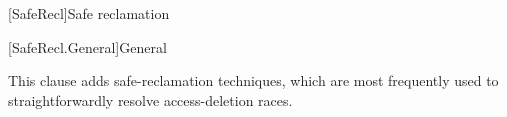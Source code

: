 
[SafeRecl]{Safe reclamation}

[SafeRecl.General]{General}

This clause adds safe-reclamation techniques, which are most frequently
used to straightforwardly resolve access-deletion races.
